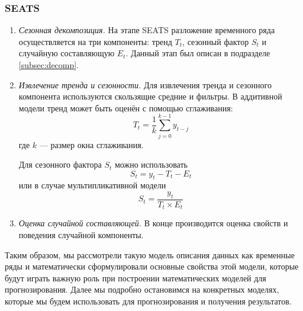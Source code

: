 \documentclass[a4paper, 14pt]{extreport}
\numberwithin{equation}{subsection}
\numberwithin{equation}{section}
\begin{document}
	\subsubsection{SEATS}
	\begin{enumerate}
		\item \textit{Сезонная декомпозиция.} На этапе SEATS разложение временного ряда осуществляется на три компоненты: тренд $T_t$, сезонный фактор $S_t$ и случайную составляющую $E_t$. Данный этап был описан в подразделе \ref{subsec:decomp}.
		
		\item \textit{Извлечение тренда и сезонности.}
		Для извлечения тренда и сезонного компонента используются скользящие средние и фильтры. В аддитивной модели тренд может быть оценён с помощью сглаживания:
		\begin{equation}
			T_t=\dfrac1k\sum\limits_{j=0}^{k-1}y_{t-j}
		\end{equation}
		где $k$ --- размер окна сглаживания.
		
		Для сезонного фактора $S_t$ можно использовать
		\begin{equation}
			S_t=y_t-T_t-E_t
		\end{equation}
		или в случае мультипликативной модели
		\begin{equation}
			S_t=\dfrac{y_t}{T_t\times E_t}
		\end{equation}
		\item \textit{Оценка случайной составляющей.} В конце производится оценка свойств и поведения случайной компоненты.
	\end{enumerate}
	
	Таким образом, мы рассмотрели такую модель описания данных как временные ряды и математически сформулировали основные свойства этой модели, которые будут играть важную роль при построении математических моделей для прогнозирования. Далее мы подробно остановимся на конкретных моделях, которые мы будем использовать для прогнозирования и получения результатов.
\end{document}
